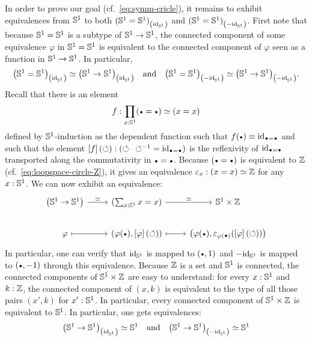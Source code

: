 \documentclass[english,a4]{article}
\renewcommand{\ap}[1]{\left[{#1}\right]}
\begin{document}
In order to prove our goal (cf.~\cref{eq:symm-cricle}), it remains to
exhibit equivalences from ${{\mathbb S^{1}}}$ to both
${({{\mathbb S^{1}}}={{\mathbb S^{1}}})}_{\left(\mathord{\mathrm{id}}_{{\mathbb S^{1}}}\right)}$ and
${({{\mathbb S^{1}}}={{\mathbb S^{1}}})}_{\left(-\mathord{\mathrm{id}}_{{\mathbb S^{1}}}\right)}$. First note that because ${{\mathbb S^{1}}}={{\mathbb S^{1}}}$ is
a subtype of ${{\mathbb S^{1}}}\to{{\mathbb S^{1}}}$, the connected component of some equivalence
$\varphi$ in ${{\mathbb S^{1}}}={{\mathbb S^{1}}}$ is equivalent to the connected component of
$\varphi$ seen as a function in ${{\mathbb S^{1}}} \to {{\mathbb S^{1}}}$. In particular,
\begin{displaymath}
  {\left({{\mathbb S^{1}}}={{\mathbb S^{1}}}\right)}_{\left(\mathord{\mathrm{id}}_{{\mathbb S^{1}}}\right)} \simeq {\left({{\mathbb S^{1}}}\to{{\mathbb S^{1}}}\right)}_{\left(\mathord{\mathrm{id}}_{{\mathbb S^{1}}}\right)}
  \quad\text{and}\quad
  {\left({{\mathbb S^{1}}}={{\mathbb S^{1}}}\right)}_{\left(-\mathord{\mathrm{id}}_{{\mathbb S^{1}}}\right)} \simeq {\left({{\mathbb S^{1}}}\to{{\mathbb S^{1}}}\right)}_{\left(-\mathord{\mathrm{id}}_{{\mathbb S^{1}}}\right)}.
\end{displaymath}
Recall that there is an element
\begin{equation}
  \label{eq:S1-loopspace-Z-at-each-x}%
  f\from \prod_{x:\Sc} (\base=\base) \weq (x=x)
\end{equation}
defined by
${{\mathbb S^{1}}}$-induction as the dependent function such that
$f(\base) \jdeq \id_{\base=\base}$ and such that the element
$\ap f (\Sloop) \from (\Sloop\blank\inv\Sloop = \id_{\base=\base})$ is
the reflexivity of $\id_{\base=\base}$ transported along the
commutativity in $\base=\base$. Because $(\base=\base)$ is equivalent
to $\mathbb{Z}$ (cf.~\cref{eq:loopspace-circle-Z}), it gives an equivalence
$\varepsilon_x: (x=x) \simeq \mathbb{Z}$ for any $x:{{\mathbb S^{1}}}$. We can now
exhibit an equivalence:
\begin{displaymath}
  \begin{tikzcd}
    \left(\Sc \to \Sc\right) \rar["\weq"] & (\sum_{x\from\Sc}x=x)
    \rar["\weq"] & \Sc \times \ZZ
    \\
    \varphi \rar[mapsto] & (\varphi(\base),\ap \varphi (\Sloop))
    \rar[mapsto] & \left(%
      \varphi(\base), \varepsilon_{\varphi(\base)}(\ap\varphi(\Sloop))%
    \right)%
\end{tikzcd}
\end{displaymath}
In particular, one can verify that $\mathord{\mathrm{id}}_{{\mathbb S^{1}}}$ is mapped to $(\base,1)$
and $-\mathord{\mathrm{id}}_{{\mathbb S^{1}}}$ is mapped to $(\base,-1)$ through this
equivalence. Because $\mathbb{Z}$ is a set and ${{\mathbb S^{1}}}$ is connected, the
connected components of ${{\mathbb S^{1}}}\times\mathbb{Z}$ are easy to understand: for
every $x:{{\mathbb S^{1}}}$ and $k:\mathbb{Z}$, the connected component of $(x,k)$ is
equivalent to the type of all those pairs $(x',k)$ for
$x':{{\mathbb S^{1}}}$. In particular, every connected component of
${{\mathbb S^{1}}}\times\mathbb{Z}$ is equivalent to ${{\mathbb S^{1}}}$. In particular, one gets
equivalences:
\begin{displaymath}
  {\left({{\mathbb S^{1}}}\to {{\mathbb S^{1}}}\right)}_{\left(\mathord{\mathrm{id}}_{{\mathbb S^{1}}}\right)} \simeq {{\mathbb S^{1}}}
  \quad\text{and}\quad
  {\left({{\mathbb S^{1}}}\to {{\mathbb S^{1}}}\right)}_{\left(-\mathord{\mathrm{id}}_{{\mathbb S^{1}}}\right)} \simeq {{\mathbb S^{1}}}
\end{displaymath}
\end{document}
